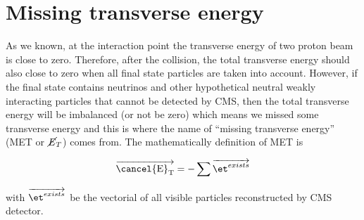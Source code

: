 \section{Missing transverse energy}\label{sec:MET}

As we known, at the interaction point the transverse energy of two proton beam is close to zero. Therefore, after the collision, the total transverse energy should also close to zero when all final state particles are taken into account. However, if the final state contains neutrinos and other hypothetical neutral weakly interacting particles that cannot be detected by CMS, then the total transverse energy will be imbalanced (or not be zero) which means we missed some transverse energy and this is where the name of ``missing transverse energy'' (MET or $\cancel{E}_T$) comes from. The mathematically definition of MET is

$$\overrightarrow{\mathrm{\cancel{E}_T}}=-\sum\overrightarrow{\et^{exists}}$$

with $\overrightarrow{\et^{exists}}$ be the vectorial \et of all visible particles reconstructed by CMS detector.

